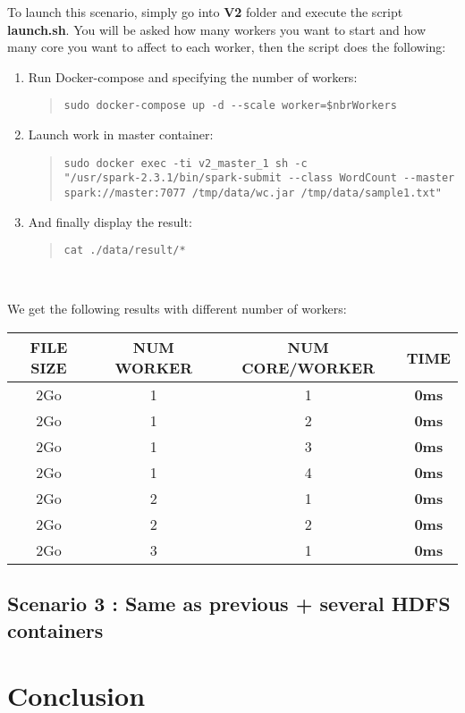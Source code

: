 \documentclass{article}
\begin{document}
\noindent To launch this scenario, simply go into \textbf{V2} folder and execute the script \textbf{launch.sh}. You will be asked how many workers you want to start and how many core you want to affect to each worker, then the script does the following:
\begin{enumerate}
    \item Run Docker-compose and specifying the number of workers:
    \begin{quote}
\begin{verbatim}
sudo docker-compose up -d --scale worker=$nbrWorkers
\end{verbatim}
    \end{quote}
    
    \item Launch work in master container:
    \begin{quote}
\begin{verbatim}
sudo docker exec -ti v2_master_1 sh -c 
"/usr/spark-2.3.1/bin/spark-submit --class WordCount --master 
spark://master:7077 /tmp/data/wc.jar /tmp/data/sample1.txt"
\end{verbatim}
    \end{quote}
    
    \item And finally display the result:
    \begin{quote}
\begin{verbatim}
cat ./data/result/*
\end{verbatim}
    \end{quote}
\end{enumerate}
\ \

\noindent We get the following results with different number of workers: \\
\begin{center}
    \begin{tabular}{||c c c c||} 
    \hline
    FILE SIZE & NUM WORKER & NUM CORE/WORKER & TIME \\ [0.5ex] 
    \hline\hline
    2Go & 1 & 1 & \textbf{0ms} \\ 
    \hline
    2Go & 1 & 2 & \textbf{0ms} \\ 
    \hline
    2Go & 1 & 3 & \textbf{0ms} \\ 
    \hline
    2Go & 1 & 4 & \textbf{0ms} \\ 
    \hline
    2Go & 2 & 1 & \textbf{0ms} \\ 
    \hline
    2Go & 2 & 2 & \textbf{0ms} \\ 
    \hline
    2Go & 3 & 1 & \textbf{0ms} \\ 
    \hline
    \end{tabular}
\end{center}
\vspace*{0.2cm}


\subsection{Scenario 3 : Same as previous + several HDFS containers}

\section{Conclusion}
\end{document}
